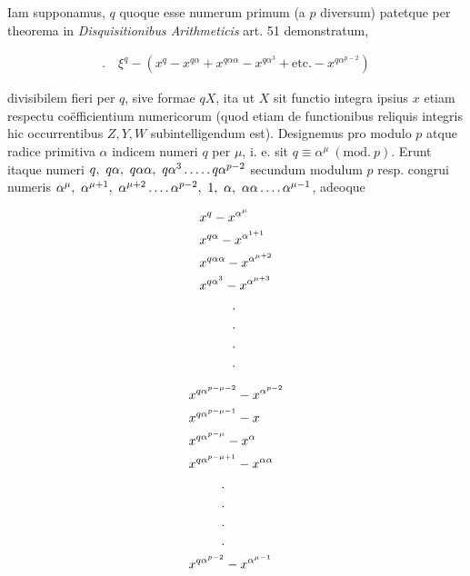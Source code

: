 
Iam supponamus, $q$ quoque esse numerum primum (a $p$ diversum) patetque per theorema in \textit{Disquisitionibus Arithmeticis} art. 51 demonstratum,

\[
\begin{aligned}
\mathord{.}\quad\xi^q-(x^q-x^{q\alpha}+x^{q\alpha\alpha}-x^{q\alpha^3}+\text{etc.}-x^{q\alpha^{p-2}})
\end{aligned}
\]

divisibilem fieri per $q$, sive formae $qX$, ita ut $X$ sit functio integra ipsius $x$ etiam respectu coëfficientium numericorum (quod etiam de functionibus reliquis integris hic occurrentibus $Z,Y,W$ subintelligendum est). Designemus pro modulo $p$ atque radice primitiva $\alpha$ indicem numeri $q$ per $\mu$, i. e. sit $q\equiv\alpha^\mu\ (\mathrm{mod.}\ p)$. Erunt itaque numeri $q,\ q\alpha,\ q\alpha\alpha,\ q\alpha^3\dotsfive q\alpha^{p-2}$ secundum modulum $p$ resp. congrui numeris $\alpha^\mu,\allowbreak\ \alpha^{\mu+1},\allowbreak\ \alpha^{\mu+2}\dotsfour\alpha^{p-2},\allowbreak\ 1,\allowbreak\ \alpha,\allowbreak\ \alpha\alpha\dotsfour\alpha^{\mu-1}$, adeoque

\[
\begin{aligned}
&x^q-x^{\alpha^\mu}\\
&x^{q\alpha}-x^{\alpha^{1+1}}\\
&x^{q\alpha\alpha}-x^{\alpha^{\mu+2}}\\
&x^{q\alpha^3}-x^{\alpha^{\mu+3}}\\
&\hspace{9mm}\begin{gathered}.\\.\\.\\.\end{gathered}
\end{aligned}
\]

%
\[
\begin{aligned}
&x^{q\alpha^{p-\mu-2}}-x^{\alpha^{p-2}}\\
&x^{q\alpha^{p-\mu-1}}-x\\
&x^{q\alpha^{p-\mu}}-x^\alpha\\
&x^{q\alpha^{p-\mu+1}}-x^{\alpha\alpha}\\
&\hspace{9mm}\begin{gathered}.\\.\\.\\.\end{gathered}\\
&x^{q\alpha^{p-2}}-x^{\alpha^{\mu-1}}
\end{aligned}
\]

